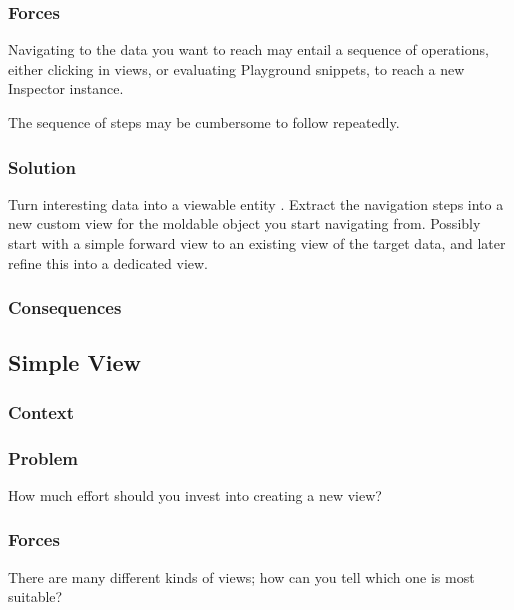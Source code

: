 \documentclass[sigconf]{acmart}
\begin{document}
\subsubsection*{Forces}

Navigating to the data you want to reach may entail a sequence of operations, either clicking in views, or evaluating Playground snippets, to reach a new Inspector instance.

The sequence of steps may be cumbersome to follow repeatedly.

\subsubsection*{Solution}

Turn interesting data into a viewable entity . Extract the navigation steps into a new custom view for the moldable object you start navigating from. Possibly start with a simple forward view to an existing view of the target data, and later refine this into a dedicated view.


\subsubsection*{Consequences}

\subsection*{Simple View}\label{pat:simpleView}
\subsubsection*{Context}
\subsubsection*{Problem}

How much effort should you invest into creating a new view?

\subsubsection*{Forces}

There are many different kinds of views; how can you tell which one is most suitable?
\end{document}
